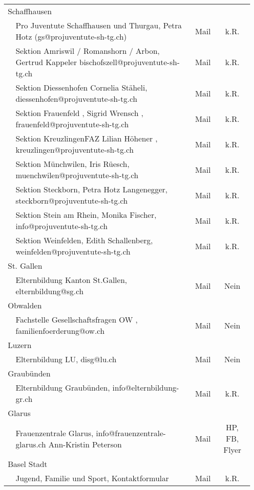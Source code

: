 \begin{longtable}[htbp]{|p{0.2em} p{20em} | c | c |}
  \multicolumn{2}{|l|}{Schaffhausen} &  &\\
  & Pro Juventute Schaffhausen und Thurgau, Petra Hotz (gs@projuventute-sh-tg.ch)  & Mail & k.R.\\
  & Sektion Amriswil / Romanshorn / Arbon, Gertrud Kappeler bischofszell@projuventute-sh-tg.ch & Mail & k.R.\\
  & Sektion Diessenhofen Cornelia Stäheli, diessenhofen@projuventute-sh-tg.ch & Mail & k.R.\\
  & Sektion Frauenfeld , Sigrid Wrensch , frauenfeld@projuventute-sh-tg.ch & Mail & k.R.\\
  & Sektion KreuzlingenFAZ Lilian Höhener , kreuzlingen@projuventute-sh-tg.ch & Mail & k.R.\\
  & Sektion Münchwilen, Iris Rüesch, muenchwilen@projuventute-sh-tg.ch & Mail & k.R.\\
  & Sektion Steckborn, Petra Hotz Langenegger, steckborn@projuventute-sh-tg.ch & Mail & k.R.\\
  & Sektion Stein am Rhein, Monika Fischer, info@projuventute-sh-tg.ch & Mail & k.R.\\
  & Sektion Weinfelden, Edith Schallenberg, weinfelden@projuventute-sh-tg.ch & Mail & k.R.\\
  
  \multicolumn{2}{|l|}{St. Gallen} &  &\\
  & Elternbildung Kanton St.Gallen, elternbildung@sg.ch & Mail & Nein\\
  
  \multicolumn{2}{|l|}{Obwalden} &  &\\
  & Fachstelle Gesellschaftsfragen OW , familienfoerderung@ow.ch & Mail & Nein\\
  
  \multicolumn{2}{|l|}{Luzern} &  &\\
  & Elternbildung LU, disg@lu.ch & Mail & Nein\\
  
  \multicolumn{2}{|l|}{Graubünden} &  &\\
  & Elternbildung Graubünden, info@elternbildung-gr.ch & Mail & k.R.\\
  
  \multicolumn{2}{|l|}{Glarus} &  &\\
  & Frauenzentrale Glarus, info@frauenzentrale-glarus.ch Ann-Kristin Peterson & Mail & HP, FB, Flyer\\
  
  \multicolumn{2}{|l|}{Basel Stadt} &  &\\
  & Jugend, Familie und Sport, Kontaktformular & Mail & k.R.\\
  

\end{longtable}

